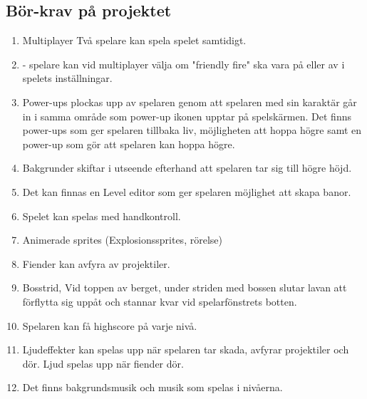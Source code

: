 \documentclass{TDP005mall}
\begin{document}
\subsection{Bör-krav på projektet}
\begin{enumerate}
\item Multiplayer Två spelare kan spela spelet samtidigt.
\item - spelare kan vid multiplayer välja om "friendly fire" ska vara på eller av i spelets inställningar. 
\item Power-ups plockas upp av spelaren genom att spelaren med sin karaktär går in i samma område som power-up ikonen upptar på spelskärmen. Det finns power-ups som ger spelaren tillbaka liv, möjligheten att hoppa högre samt en power-up som gör att spelaren kan hoppa högre.
\item Bakgrunder skiftar i utseende efterhand att spelaren tar sig till högre höjd.
\item Det kan finnas en Level editor som ger spelaren möjlighet att skapa banor.
\item Spelet kan spelas med handkontroll.
\item Animerade sprites (Explosionssprites, rörelse)
\item Fiender kan avfyra av projektiler.
\item Bosstrid, Vid toppen av berget, under striden med bossen slutar lavan att förflytta sig uppåt och stannar kvar vid spelarfönstrets botten.
\item Spelaren kan få highscore på varje nivå.
\item Ljudeffekter kan spelas upp när spelaren tar skada, avfyrar projektiler och dör. Ljud spelas upp när fiender dör.
\item Det finns bakgrundsmusik och musik som spelas i nivåerna.
\end{enumerate}
\end{document}
